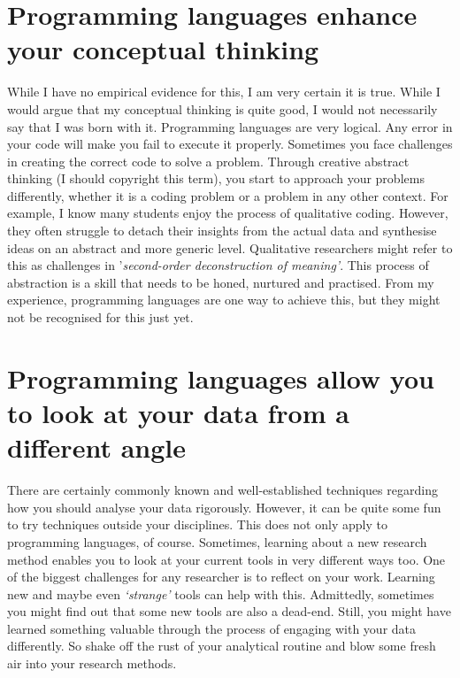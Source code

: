 \documentclass[
]{book}
\begin{document}
\hypertarget{programming-languages-enhance-your-conceptual-thinking}{%
\section{Programming languages enhance your conceptual thinking}\label{programming-languages-enhance-your-conceptual-thinking}}

While I have no empirical evidence for this, I am very certain it is true. While I would argue that my conceptual thinking is quite good, I would not necessarily say that I was born with it. Programming languages are very logical. Any error in your code will make you fail to execute it properly. Sometimes you face challenges in creating the correct code to solve a problem. Through creative abstract thinking (I should copyright this term), you start to approach your problems differently, whether it is a coding problem or a problem in any other context. For example, I know many students enjoy the process of qualitative coding. However, they often struggle to detach their insights from the actual data and synthesise ideas on an abstract and more generic level. Qualitative researchers might refer to this as challenges in '\emph{second-order deconstruction of meaning'}. This process of abstraction is a skill that needs to be honed, nurtured and practised. From my experience, programming languages are one way to achieve this, but they might not be recognised for this just yet.

\hypertarget{programming-languages-allow-you-to-look-at-your-data-from-a-different-angle}{%
\section{Programming languages allow you to look at your data from a different angle}\label{programming-languages-allow-you-to-look-at-your-data-from-a-different-angle}}

There are certainly commonly known and well-established techniques regarding how you should analyse your data rigorously. However, it can be quite some fun to try techniques outside your disciplines. This does not only apply to programming languages, of course. Sometimes, learning about a new research method enables you to look at your current tools in very different ways too. One of the biggest challenges for any researcher is to reflect on your work. Learning new and maybe even \emph{`strange'} tools can help with this. Admittedly, sometimes you might find out that some new tools are also a dead-end. Still, you might have learned something valuable through the process of engaging with your data differently. So shake off the rust of your analytical routine and blow some fresh air into your research methods.
\end{document}
